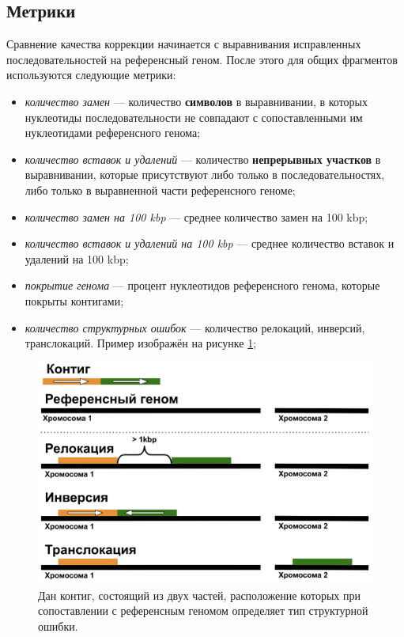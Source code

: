 \documentclass[14pt]{matmex-diploma-custom}
\begin{document}
\subsection{Метрики}
Сравнение качества коррекции начинается с выравнивания исправленных последовательностей на референсный геном. После этого для общих фрагментов используются следующие метрики:
\begin{itemize}
    \item \textit{количество замен} --- количество \textbf{символов} в выравнивании, в которых нуклеотиды последовательности не совпадают с сопоставленными им нуклеотидами референсного генома;
    \item \textit{количество вставок и удалений} --- количество \textbf{непрерывных участков} в выравнивании, которые присутствуют либо только в последовательностях, либо только в выравненной части референсного геноме;
    \item \textit{количество замен на 100 kbp} --- среднее количество замен на 100 kbp;
    \item \textit{количество вставок и удалений на 100 kbp} --- среднее количество вставок и удалений на 100 kbp;
    \item \textit{покрытие генома} --- процент нуклеотидов референсного генома, которые покрыты контигами;
    \item \textit{количество структурных ошибок} --- количество релокаций, инверсий, транслокаций. Пример изображён на рисунке \ref{fig:miss};
\end{itemize}

\begin{figure}[h]
    \centering
    \includegraphics[scale=0.4]{misassemblies.png}
    \caption{Дан контиг, состоящий из двух частей, расположение которых при сопоставлении с референсным геномом определяет тип структурной ошибки.}
    \label{fig:miss}
\end{figure}
\end{document}
